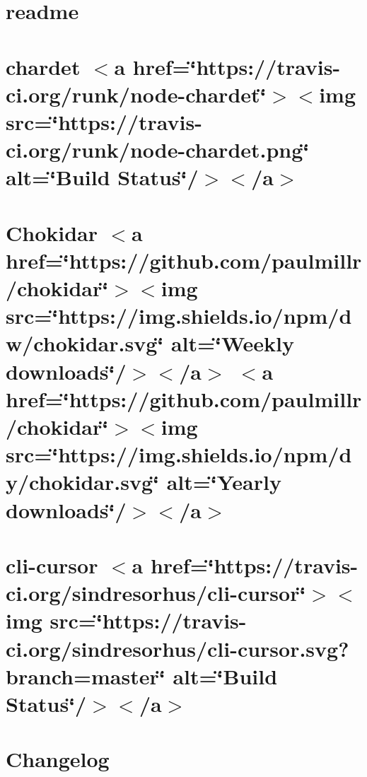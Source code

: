 \let\mypdfximage\pdfximage\def\pdfximage{\immediate\mypdfximage}\documentclass[twoside]{book}
\newcommand{\+}{\discretionary{\mbox{\scriptsize$\hookleftarrow$}}{}{}}
\begin{document}
\chapter{readme}
\label{md_heap-visualizer_node_modules_chalk_readme}

\chapter{chardet $<$a href=\char`\"{}https\+://travis-\/ci.\+org/runk/node-\/chardet\char`\"{}$>$$<$img src=\char`\"{}https\+://travis-\/ci.\+org/runk/node-\/chardet.\+png\char`\"{} alt=\char`\"{}\+Build Status\char`\"{}/$>$$<$/a$>$}
\label{md_heap-visualizer_node_modules_chardet__r_e_a_d_m_e}

\chapter{Chokidar $<$a href=\char`\"{}https\+://github.\+com/paulmillr/chokidar\char`\"{}$>$$<$img src=\char`\"{}https\+://img.\+shields.\+io/npm/dw/chokidar.\+svg\char`\"{} alt=\char`\"{}\+Weekly downloads\char`\"{}/$>$$<$/a$>$ $<$a href=\char`\"{}https\+://github.\+com/paulmillr/chokidar\char`\"{}$>$$<$img src=\char`\"{}https\+://img.\+shields.\+io/npm/dy/chokidar.\+svg\char`\"{} alt=\char`\"{}\+Yearly downloads\char`\"{}/$>$$<$/a$>$}
\label{md_heap-visualizer_node_modules_chokidar__r_e_a_d_m_e}

\chapter{cli-\/cursor $<$a href=\char`\"{}https\+://travis-\/ci.\+org/sindresorhus/cli-\/cursor\char`\"{}$>$$<$img src=\char`\"{}https\+://travis-\/ci.\+org/sindresorhus/cli-\/cursor.\+svg?branch=master\char`\"{} alt=\char`\"{}\+Build Status\char`\"{}/$>$$<$/a$>$}
\label{md_heap-visualizer_node_modules_cli-cursor_readme}

\chapter{Changelog}
\label{md_heap-visualizer_node_modules_cli-width__c_h_a_n_g_e_l_o_g}

\end{document}
